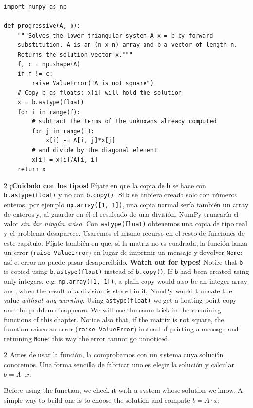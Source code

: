 \begin{verbatim}
import numpy as np

def progressive(A, b):
    """Solves the lower triangular system A x = b by forward
    substitution. A is an (n x n) array and b a vector of length n.
    Returns the solution vector x."""
    f, c = np.shape(A)
    if f != c:
        raise ValueError("A is not square")
    # Copy b as floats: x[i] will hold the solution
    x = b.astype(float)
    for i in range(f):
        # subtract the terms of the unknowns already computed
        for j in range(i):
            x[i] -= A[i, j]*x[j]
        # and divide by the diagonal element
        x[i] = x[i]/A[i, i]
    return x
\end{verbatim}

\begin{paracol}{2}
\textbf{¡Cuidado con los tipos!} Fíjate en que la copia de \texttt{b} se hace con \texttt{b.astype(float)} y no con \texttt{b.copy()}. Si \texttt{b} se hubiera creado solo con números enteros, por ejemplo \texttt{np.array([1, 1])}, una copia normal sería también un array de enteros y, al guardar en él el resultado de una división, NumPy truncaría el valor \emph{sin dar ningún aviso}. Con \texttt{astype(float)} obtenemos una copia de tipo real y el problema desaparece. Usaremos el mismo recurso en el resto de funciones de este capítulo. Fíjate también en que, si la matriz no es cuadrada, la función lanza un error (\texttt{raise ValueError}) en lugar de imprimir un mensaje y devolver \texttt{None}: así el error no puede pasar desapercibido.
\switchcolumn
\textbf{Watch out for types!} Notice that \texttt{b} is copied using \texttt{b.astype(float)} instead of \texttt{b.copy()}. If \texttt{b} had been created using only integers, e.g. \texttt{np.array([1, 1])}, a plain copy would also be an integer array and, when the result of a division is stored in it, NumPy would truncate the value \emph{without any warning}. Using \texttt{astype(float)} we get a floating point copy and the problem disappears. We will use the same trick in the remaining functions of this chapter. Notice also that, if the matrix is not square, the function raises an error (\texttt{raise ValueError}) instead of printing a message and returning \texttt{None}: this way the error cannot go unnoticed.
\end{paracol}

\begin{paracol}{2}
Antes de usar la función, la comprobamos con un sistema cuya solución conocemos. Una forma sencilla de fabricar uno es elegir la solución y calcular $b=A\cdot x$:

\switchcolumn
Before using the function, we check it with a system whose solution we know. A simple way to build one is to choose the solution and compute $b=A\cdot x$:
\end{paracol}

